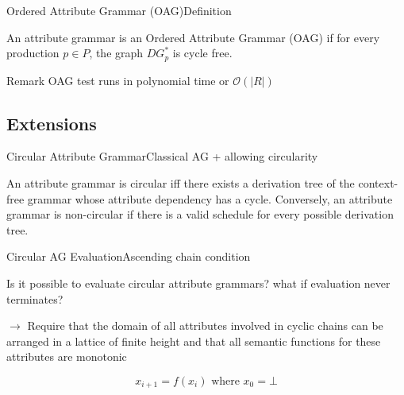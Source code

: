 \begin{frame}{Ordered Attribute Grammar (OAG)}{Definition}

\begin{definition}
An attribute grammar is an Ordered Attribute Grammar (OAG) if for every production $p \in P$, the graph $\mathit{DG}_p^*$ is \alert{cycle free}.
\end{definition}

\begin{block}{Remark}
OAG test runs in polynomial time or $\mathcal{O}(|R|)$
\end{block}




\end{frame}


\subsection*{Extensions}

\begin{frame}{Circular Attribute Grammar}{Classical AG + allowing circularity}
\begin{definition}
An attribute grammar is \alert{circular} iff there exists a derivation tree of the context-free grammar whose \alert{attribute dependency has a cycle}. Conversely, an attribute grammar is non-circular if there is a valid schedule for every possible derivation tree.
\end{definition}
\end{frame}


\begin{frame}{Circular AG Evaluation}{Ascending chain condition}

Is it possible to evaluate circular attribute grammars? what if \alert{evaluation never terminates}?

\newlinevspace

$\to$ Require that the domain of all attributes involved in cyclic chains can be arranged in a \alert{lattice of finite height} and that all semantic functions for these attributes are \alert{monotonic}

\[ x_{i+1} = f(x_i) \text{ where } x_0 = \bot \]

\end{frame}

